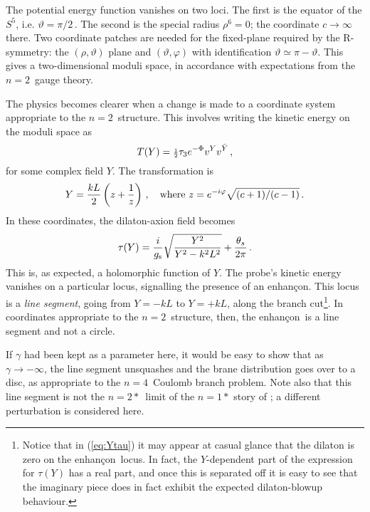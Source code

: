 \documentclass[a4paper,12pt]{amsproc}
\numberwithin{equation}{section}
\def\half{\mbox{\scriptsize{${{1}\over{2}}$}}}
\def\gs{g_{\rm{s}}}
\def\enh{enhan\c con}
\def\nef{$n{=}4$}
\def\net{$n{=}2$}
\def\nets{$n{=}2*$}
\def\vtpt{$\vartheta=\pi/2$\,}
\begin{document}
The potential energy function vanishes on two loci.  The first is the
equator of the $S^5$, i.e. \vtpt.  The second is the special radius
$\rho^6=0$; the coordinate $c\rightarrow\infty$ there.  Two coordinate
patches are needed for the fixed-plane required by the R-symmetry: the
$(\rho,\vartheta)$ plane and $(\vartheta,\varphi)$ with identification
$\vartheta\simeq\pi-\vartheta$.  This gives a two-dimensional moduli
space, in accordance with expectations from the \net\ gauge theory.

The physics becomes clearer when a change is made to a coordinate
system appropriate to the \net\ structure.  This involves writing the
kinetic energy on the moduli space as
%
\begin{equation}
T(Y) = \half \tau_3 e^{-\Phi} v^Y v^{\bar{Y}} \,,
\end{equation}
%
for some complex field $Y$.  The transformation is
%
\begin{equation}
Y={{kL}\over{2}} \left(z+{{1}\over{z}} \right) \,, \quad {\rm{where\
}} z=e^{-i\varphi}\sqrt{(c+1)/(c-1)} \,.
\end{equation}
%
In these coordinates, the dilaton-axion field becomes
%
\begin{equation}\label{eq:Ytau}
\tau(Y) = {{i}\over{\gs}} \sqrt{{Y^2}\over{Y^2-k^2L^2}} + 
{{\theta_s}\over{2\pi}} \,.
\end{equation}
%
This is, as expected, a holomorphic function of $Y$.  
%
The probe's kinetic energy vanishes on a particular locus, signalling
the presence of an \enh.  This locus is a {\em line segment}, going
from $Y=-kL$ to $Y=+kL$, along the branch cut\footnote{Notice that in
(\ref{eq:Ytau}) it may appear at casual glance that the dilaton is
zero on the \enh\ locus.  In fact, the $Y$-dependent part of the
expression for $\tau(Y)$ has a real part, and once this is separated
off it is easy to see that the imaginary piece does in fact exhibit
the expected dilaton-blowup behaviour.}.  In coordinates appropriate
to the \net\ structure, then, the \enh\ is a line segment and not a
circle.

If $\gamma$ had been kept as a parameter here, it would be easy to
show that as $\gamma\rightarrow-\infty$, the line segment unsquashes
and the brane distribution goes over to a disc, as appropriate to the
\nef\ Coulomb branch problem.  Note also that this line segment is not
the \nets\ limit of the $n{=}1*$ story of \cite{polstr}; a different
perturbation is considered here.

\end{document}
